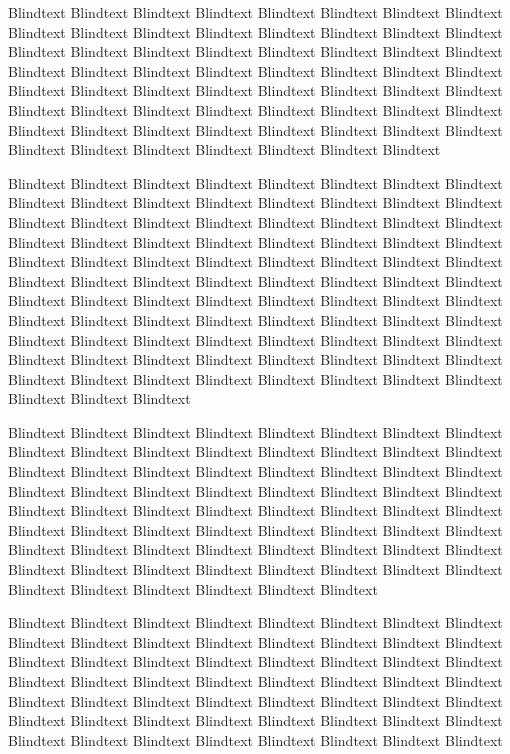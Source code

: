 Blindtext Blindtext Blindtext Blindtext Blindtext Blindtext Blindtext
Blindtext Blindtext Blindtext Blindtext Blindtext Blindtext Blindtext
Blindtext Blindtext Blindtext Blindtext Blindtext Blindtext Blindtext
Blindtext Blindtext Blindtext Blindtext Blindtext Blindtext Blindtext
Blindtext Blindtext Blindtext Blindtext Blindtext Blindtext Blindtext
Blindtext Blindtext Blindtext Blindtext Blindtext Blindtext Blindtext
Blindtext Blindtext Blindtext Blindtext Blindtext Blindtext Blindtext
Blindtext Blindtext Blindtext Blindtext Blindtext Blindtext Blindtext
Blindtext Blindtext Blindtext Blindtext Blindtext Blindtext Blindtext

Blindtext Blindtext Blindtext Blindtext Blindtext Blindtext Blindtext
Blindtext Blindtext Blindtext Blindtext Blindtext Blindtext Blindtext
Blindtext Blindtext Blindtext Blindtext Blindtext Blindtext Blindtext
Blindtext Blindtext Blindtext Blindtext Blindtext Blindtext Blindtext
Blindtext Blindtext Blindtext Blindtext Blindtext Blindtext Blindtext
Blindtext Blindtext Blindtext Blindtext Blindtext Blindtext Blindtext
Blindtext Blindtext Blindtext Blindtext Blindtext Blindtext Blindtext
Blindtext Blindtext Blindtext Blindtext Blindtext Blindtext Blindtext
Blindtext Blindtext Blindtext Blindtext Blindtext Blindtext Blindtext
Blindtext Blindtext Blindtext Blindtext Blindtext Blindtext Blindtext
Blindtext Blindtext Blindtext Blindtext Blindtext Blindtext Blindtext
Blindtext Blindtext Blindtext Blindtext Blindtext Blindtext Blindtext
Blindtext Blindtext Blindtext Blindtext Blindtext Blindtext Blindtext

Blindtext Blindtext Blindtext Blindtext Blindtext Blindtext Blindtext
Blindtext Blindtext Blindtext Blindtext Blindtext Blindtext Blindtext
Blindtext Blindtext Blindtext Blindtext Blindtext Blindtext Blindtext
Blindtext Blindtext Blindtext Blindtext Blindtext Blindtext Blindtext
Blindtext Blindtext Blindtext Blindtext Blindtext Blindtext Blindtext
Blindtext Blindtext Blindtext Blindtext Blindtext Blindtext Blindtext
Blindtext Blindtext Blindtext Blindtext Blindtext Blindtext Blindtext
Blindtext Blindtext Blindtext Blindtext Blindtext Blindtext Blindtext
Blindtext Blindtext Blindtext Blindtext Blindtext Blindtext Blindtext
Blindtext Blindtext Blindtext Blindtext Blindtext Blindtext Blindtext

Blindtext Blindtext Blindtext Blindtext Blindtext Blindtext Blindtext
Blindtext Blindtext Blindtext Blindtext Blindtext Blindtext Blindtext
Blindtext Blindtext Blindtext Blindtext Blindtext Blindtext Blindtext
Blindtext Blindtext Blindtext Blindtext Blindtext Blindtext Blindtext
Blindtext Blindtext Blindtext Blindtext Blindtext Blindtext Blindtext
Blindtext Blindtext Blindtext Blindtext Blindtext Blindtext Blindtext
Blindtext Blindtext Blindtext Blindtext Blindtext Blindtext Blindtext
Blindtext Blindtext Blindtext Blindtext Blindtext Blindtext Blindtext

